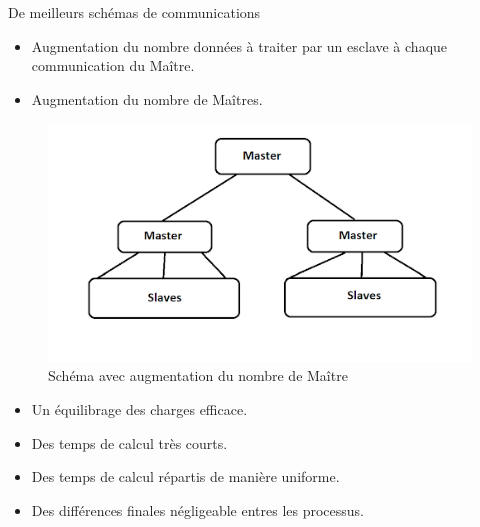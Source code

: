 \begin{frame}
\begin{block}{De meilleurs schémas de communications}
\begin{itemize}
\item Augmentation du nombre données à traiter par un esclave à chaque communication du Maître.\vspace{1em}
\item Augmentation du nombre de Maîtres.
\end{itemize}
\end{block}
\end{frame}

\begin{frame}
\begin{figure}[!ht]	
		\begin{center}\includegraphics[scale=0.55]{Masters2.png}\end{center}
		\caption{Schéma avec augmentation du nombre de Maître}
		\label{fg:fig12}
	\end{figure}
\end{frame}

\begin{frame}
\begin{itemize}
\item Un équilibrage des charges efficace. \vspace{1.5em}
\item Des temps de calcul très courts.\vspace{1.5em}
\item Des temps de calcul répartis de manière uniforme. \vspace{1.5em}
\item Des différences finales négligeable entres les processus.\\
\end{itemize}
\end{frame}

